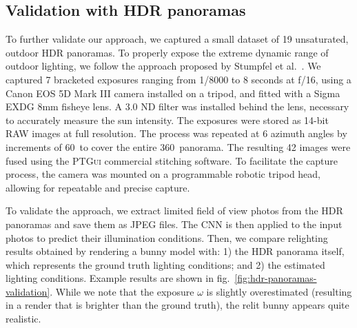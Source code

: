 \subsection{Validation with HDR panoramas}
\label{subsec:relighting_hdr}

To further validate our approach, we captured a small dataset of 19 unsaturated, outdoor HDR panoramas. To properly expose the extreme dynamic range of outdoor lighting, we follow the approach proposed by Stumpfel et al.~\cite{stumpfel-afrigraph-04}. We captured 7 bracketed exposures ranging from 1/8000 to 8 seconds at f/16, using a Canon EOS 5D Mark III camera installed on a tripod, and fitted with a Sigma EXDG 8mm fisheye lens. A 3.0 ND filter was installed behind the lens, necessary to accurately measure the sun intensity. The exposures were stored as 14-bit RAW images at full resolution. The process was repeated at 6 azimuth angles by increments of 60\degree ~to cover the entire 360\degree ~panorama. The resulting 42 images were fused using the \textsc{PTGui} commercial stitching software. To facilitate the capture process, the camera was mounted on a programmable robotic tripod head, allowing for repeatable and precise capture. %


To validate the approach, we extract limited field of view photos from the HDR panoramas and save them as JPEG files. The CNN is then applied to the input photos to predict their illumination conditions. Then, we compare relighting results obtained by rendering a bunny model with: 1) the HDR panorama itself, which represents the ground truth lighting conditions; and 2) the estimated lighting conditions. Example results are shown in fig.~\ref{fig:hdr-panoramas-validation}. While we note that the exposure $\omega$ is slightly overestimated (resulting in a render that is brighter than the ground truth), the relit bunny appears quite realistic. 
  

